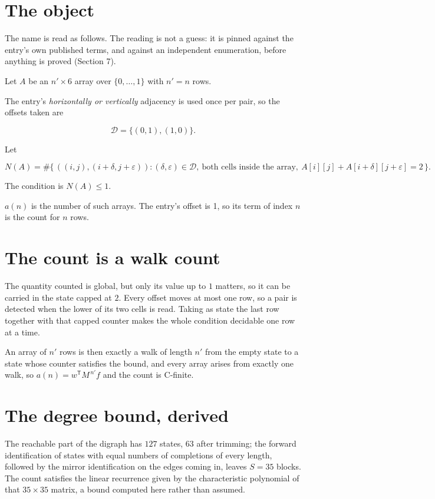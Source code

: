\documentclass[11pt]{article}
\theoremstyle{definition}
\begin{document}
\section{The object}

The name is read as follows. The reading is not a guess: it is pinned against the entry's own published terms, and against an independent enumeration, before anything is proved (Section 7).

Let $A$ be an $n' \times 6$ array over $\{0,\dots,1\}$ with $n' = n$ rows.

The entry's {\itshape horizontally or vertically} adjacency is used once per pair, so the offsets taken are

\[\mathcal{D} = \{(0,1), (1,0)\}.\]

Let

\[N(A) = \#\bigl\{\,((i,j),(i{+}\delta,j{+}\varepsilon)) : (\delta,\varepsilon) \in \mathcal{D},\ \text{both cells inside the array},\ A[i][j] + A[i{+}\delta][j{+}\varepsilon] = 2\,\bigr\}.\]

The condition is $N(A) \le 1$.

$a(n)$ is the number of such arrays. The entry's offset is 1, so its term of index $n$ is the count for $n$ rows.

\section{The count is a walk count}

The quantity counted is global, but only its value up to $1$ matters, so it can be carried in the state capped at $2$. Every offset moves at most one row, so a pair is detected when the lower of its two cells is read. Taking as state the last row together with that capped counter makes the whole condition decidable one row at a time.

An array of $n'$ rows is then exactly a walk of length $n'$ from the empty state to a state whose counter satisfies the bound, and every array arises from exactly one walk, so $a(n) = w^{\mathsf T}M^{\,n'}f$ and the count is C-finite.

\section{The degree bound, derived}

The reachable part of the digraph has $127$ states, $63$ after trimming; the forward identification of states with equal numbers of completions of every length, followed by the mirror identification on the edges coming in, leaves $S = 35$ blocks. The count satisfies the linear recurrence given by the characteristic polynomial of that $35\times35$ matrix, a bound computed here rather than assumed.
\end{document}
